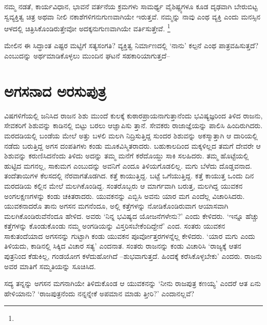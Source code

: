 ನಮ್ಮ ನಡತೆ, ಕಾರ್ಯವಿಧಾನ, ಭಾವನೆ ವರ್ತನೆಯ ಕ್ರಮಗಳು ಸಾಮರ್ಥ್ಯ ವೈಶಿಷ್ಟ್ಯಗಳೂ ಕೂಡ ದೃಢವಾಗಿ ಬೇರುಬಿಟ್ಟ ಸ್ವವ್ಯಕ್ತಿತ್ವ ಚಿತ್ರ ಅಥವಾ ನೀಲಿ ನಕಾಶೆಗಳಿಗನುಗುಣವಾಗಿಯೇ ಇರುತ್ತವೆ. ನಮ್ಮನ್ನು ನಾವು ಎಂಥ ವ್ಯಕ್ತಿ ಎಂದು ಮನಸ್ಸಿನ ಆಳದಲ್ಲಿ ಚಿತ್ರಿಸಿಕೊಂಡಿರುತ್ತೇವೋ ಅದಕ್ಕನುಗುಣವಾಗಿಯೇ ವರ್ತಿಸುತ್ತೇವೆ. \footnote{\hfill{}}

ಮೇಲಿನ ಈ ಸಿದ್ಧಾಂತ ಎಷ್ಟರ ಮಟ್ಟಿಗೆ ಸತ್ಯಸಂಗತಿ? ವ್ಯಕ್ತಿತ್ವ ನಿರ್ಮಾಣದಲ್ಲಿ ‘ನಾನು’ ಕಲ್ಪನೆ ಎಂಥ ಪಾತ್ರವಹಿಸುತ್ತದೆ? ಎಂಬುದನ್ನು ಅರ್ಥಮಾಡಿಕೊಳ್ಳಲು ಮುಂದಿನ ಘಟನೆ ಸಹಕಾರಿಯಾಗುತ್ತದೆ–


\section*{ಅಗಸನಾದ ಅರಸುಪುತ್ರ}


ವಿಷಗಳಿಗೆಯಲ್ಲಿ ಜನಿಸಿದ ರಾಜನ ಶಿಶು ಮುಂದೆ ಕುಲಕ್ಕೆ ಕುಠಾರಪ್ರಾಯನಾಗುತ್ತಾನೆಂದು ಭವಿಷ್ಯಜ್ಞರಿಂದ ತಿಳಿದ ರಾಜನು, ಸೇವಕರಿಗೆ ಶಿಶುವನ್ನು ಕಾಡಿನಲ್ಲಿ ಬಿಟ್ಟು ಬರಲು ಆಜ್ಞಾಪಿಸು ತ್ತಾನೆ. ಸೇವಕರು ರಾಜಾಜ್ಞೆಯನ್ನು ಪಾಲಿಸಿ ಹಿಂದಿರುಗಿದರು. ಮರದಡಿಯಲ್ಲಿ ಬಂಡೆಯ ಮೇಲೆ ಅತ್ತು ಬಳಲಿ ಮಲಗಿ ನಿದ್ರಿಸುತ್ತಿದ್ದ ಸುಂದರ ಶಿಶುವನ್ನು ಅಕಸ್ಮಾತ್ತಾಗಿ ಆ ದಾರಿಯಲ್ಲಿ ನಡೆದು ಬರುತ್ತಿದ್ದ ಅಗಸ ದಂಪತಿಗಳು ಕಂಡು ಮೂಕವಿಸ್ಮಿತರಾದರು. ಬಹುಕಾಲದಿಂದ ಮಕ್ಕಳಿಲ್ಲದ ತಮಗೆ ದೇವರೇ ಆ ಶಿಶುವನ್ನು ಕರುಣಿಸಿದನೆಂದು ತಿಳಿದು ಅದನ್ನು ತಮ್ಮ ಮನೆಗೆ ಕರೆದೊಯ್ದು ಸಾಕಿ ಸಲಹಿದರು. ತಮ್ಮ ಹೊಟ್ಟೆಯಲ್ಲಿ ಹುಟ್ಟಿದ ಮಗನಲ್ಲ, ಸಾಕುಮಗ ಎಂಬುದನ್ನು ಅವನಿಗೆ ಎಂದೂ ತಿಳಿಯಗೊಡಲಿಲ್ಲ. ಮಗು ಬೆಳೆದು ದೊಡ್ಡವನಾದ. ತಂದೆತಾಯಿಗಳ ಕೆಲಸದಲ್ಲಿ ನೆರವಾಗತೊಡಗಿದ. ಕತ್ತೆ ಕಾಯುತ್ತಿದ್ದ. ಬಟ್ಟೆ ಒಗೆಯುತ್ತಿದ್ದ. ಕತ್ತೆ ಕಾಯುತ್ತ ಒಂದು ದಿನ ಮರದಡಿಯ ಕಲ್ಲಿನ ಮೇಲೆ ಮಲಗಿಕೊಂಡಿದ್ದ. ಸಂತರೊಬ್ಬರು ಆ ಮಾರ್ಗವಾಗಿ ಬರುತ್ತ, ಮಲಗಿದ್ದ ಯುವಕನ ಅಂಗಲಕ್ಷಣಗಳನ್ನು ಕಂಡು ಚಕಿತರಾದರು. ಯುವಕನನ್ನು ಎಬ್ಬಿಸಿ ಅವನು ಯಾರ ಮಗ ಎಂದೆಲ್ಲ ವಿಚಾರಿಸಿದರು. ಯುವಕನಾದರೊ ತಾನು ಅಗಸನ ಮಗನೆಂದೂ, ಅಲ್ಲಿ ಕತ್ತೆಗಳನ್ನು ನೋಡಿಕೊಂಡಿರುವಾಗ ಆಯಾಸವಾಗಿ ಮಲಗಿಕೊಂಡಿರುವೆನೆಂದೂ ಹೇಳಿದ. ಅವರು ‘ನಿನ್ನ ಭವಿಷ್ಯದ ಯೋಜನೆಗಳೇನು?’ ಎಂದು ಕೇಳಿದರು. ‘ಇನ್ನೂ ಹೆಚ್ಚು ಕತ್ತೆಗಳನ್ನು ಕೊಂಡುಕೊಂಡು ನಮ್ಮ ಅಂಗಡಿಯನ್ನು ವಿಸ್ತರಿಸಬೇಕೆಂದಿದ್ದೇನೆ’ ಎಂದ. ಸಂತರು ಯುವಕನ ಸಾಕುತಂದೆಯಾದ ಅಗಸನನ್ನು ಗುಟ್ಟಾಗಿ ಕಂಡು ಯುವಕನ ಪೂರ್ವೋತ್ತರಗಳನ್ನೆಲ್ಲ ಕೇಳಿದರು. ‘ಯಾರ ಮಗು ಎಂದು ತಿಳಿಯದು, ಕಾಡಿನಲ್ಲಿ ಸಿಕ್ಕಿದ ವಿಚಾರ ಸತ್ಯ’ ಎಂದನಾತ. ಸಂತರು ರಾಜನನ್ನು ಕಂಡು ವಿಚಾರಿಸಿ ‘ರಾಜ್ಯಕ್ಕೆ ಆತನ ಪುತ್ರನಿಂದ ಕೆಡುಕಿಲ್ಲ, ಗಂಡಯೋಗ ಕಳೆದುಹೋಗಿದೆ –ಶುಭವಾಗುತ್ತದೆ. ಹಿಂದಕ್ಕೆ ಕರೆಸಿಕೊಳ್ಳಬೇಕು’ ಎಂದರು. ರಾಜನು ಅವರ ಮಾತಿಗೆ ಸಮ್ಮತಿಯನ್ನು ಸೂಚಿಸಿದ.

ಸದ್ಯ ತನ್ನನ್ನು ಅಗಸನ ಮಗನಾಗಿಯೇ ತಿಳಿದುಕೊಂಡ ಆ ಯುವಕನನ್ನು ‘ನೀನು ರಾಜಪುತ್ರ ಕಣಯ್ಯ’ ಎಂದರೆ ಆತ ಏನು ಹೇಳಿಯಾನು? ‘ರಾಜಪುತ್ರನೆಂದು ನನ್ನನ್ನೇಕೆ ಅಪಮಾನ ಮಾಡು ತ್ತೀರಿ?’ ಎಂದಾನಲ್ಲವೆ?

